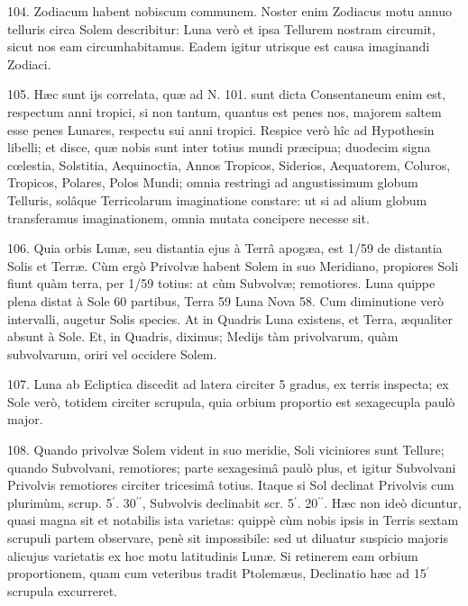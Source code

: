 \documentclass[a4paper, 11pt, oneside, polutonikogreek, german]{article}
\begin{document}
104. Zodiacum habent nobiscum communem. Noster enim Zodiacus motu annuo telluris circa Solem describitur: Luna verò et ipsa Tellurem nostram circumit, sicut nos eam circumhabitamus. Eadem igitur utrisque est causa imaginandi Zodiaci.

105. Hæc sunt ijs correlata, quæ ad N. 101. sunt dicta Consentaneum enim est, respectum anni tropici, si non tantum, quantus est penes nos, majorem saltem esse penes Lunares, respectu sui anni tropici.\hspace*{5mm}
Respice verò hîc ad Hypothesin libelli; et disce, quæ nobis sunt inter totius mundi præcipua; duodecim signa cœlestia, Solstitia, Aequinoctia, Annos Tropicos, Siderios, Aequatorem, Coluros, Tropicos, Polares, Polos Mundi; omnia restringi ad angustissimum globum Telluris, solâque Terricolarum imaginatione constare: ut si ad alium globum transferamus imaginationem, omnia mutata concipere necesse sit.

106. Quia orbis Lunæ, seu distantia ejus à Terrâ apogæa, est 1/59 de distantia Solis et Terræ. Cùm ergò Privolvæ habent Solem in suo Meridiano, propiores Soli fiunt quàm terra, per 1/59 totius: at cùm Subvolvæ; remotiores. Luna quippe plena distat à Sole 60 partibus, Terra 59 Luna Nova 58. Cum diminutione verò intervalli, augetur Solis species. At in Quadris Luna existens, et Terra, æqualiter absunt à Sole. Et, in Quadris, diximus; Medijs tàm privolvarum, quàm subvolvarum, oriri vel occidere Solem.

107. Luna ab Ecliptica discedit ad latera circiter 5 gradus, ex terris inspecta; ex Sole verò, totidem circiter scrupula, quia orbium proportio est sexagecupla paulò major.

108. Quando privolvæ Solem vident in suo meridie, Soli viciniores sunt Tellure; quando Subvolvani, remotiores; parte sexagesimâ paulò plus, et igitur Subvolvani Privolvis remotiores circiter tricesimâ totius. Itaque si Sol declinat Privolvis cum plurimùm, scrup. 5$^{\prime}$. 30$^{\prime\prime}$, Subvolvis declinabit scr. 5$^{\prime}$. 20$^{\prime\prime}$. Hæc non ideò dicuntur, quasi magna sit et notabilis ista varietas: quippè cùm nobis ipsis in Terris sextam scrupuli partem observare, penè sit impossibile: sed ut diluatur suspicio majoris alicujus varietatis ex hoc motu latitudinis Lunæ. Si retinerem eam orbium proportionem, quam cum veteribus tradit Ptolemæus, Declinatio hæc ad 15$^{\prime}$ scrupula excurreret.
\end{document}
